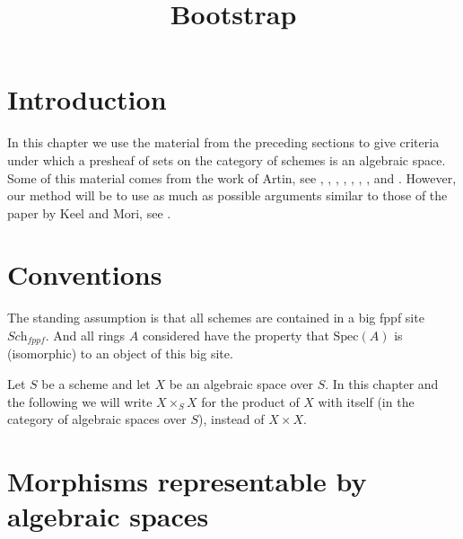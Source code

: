 

%


\title{Bootstrap}

\maketitle

\label{section-phantom}

\tableofcontents




\section{Introduction}
\label{section-introduction}

\noindent
In this chapter we use the material from the preceding sections to
give criteria under which a presheaf of sets on the category of schemes
is an algebraic space. Some of this material comes from the work
of Artin, see \cite{ArtinI}, \cite{ArtinII},
\cite{Artin-Theorem-Representability},
\cite{Artin-Construction-Techniques},
\cite{Artin-Algebraic-Spaces},
\cite{Artin-Algebraic-Approximation},
\cite{Artin-Implicit-Function},
and \cite{ArtinVersal}.
However, our method will be to use as much as possible arguments
similar to those of the paper by Keel and Mori, see
\cite{K-M}.

\section{Conventions}
\label{section-conventions}

\noindent
The standing assumption is that all schemes are contained in
a big fppf site $\textit{Sch}_{fppf}$. And all rings $A$ considered
have the property that $\text{Spec}(A)$ is (isomorphic) to an
object of this big site.

\medskip\noindent
Let $S$ be a scheme and let $X$ be an algebraic space over $S$.
In this chapter and the following we will write $X \times_S X$
for the product of $X$ with itself (in the category of algebraic
spaces over $S$), instead of $X \times X$.




\section{Morphisms representable by algebraic spaces}
\label{section-morphism-representable-by-spaces}

